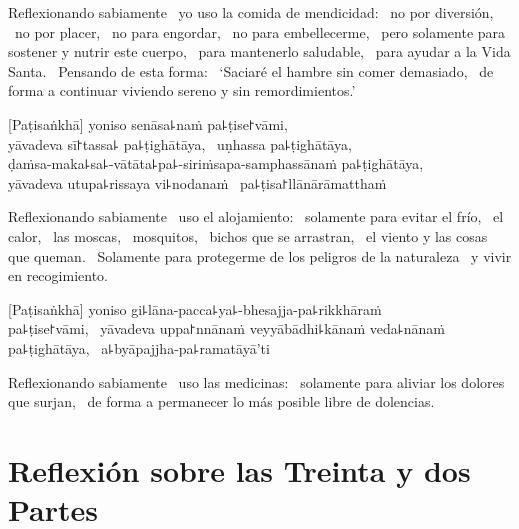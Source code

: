 \begin{english}
  Reflexionando sabiamente \pause\ yo uso la comida de mendicidad: \pause\ no por
  diversión, \pause\ no por placer, \pause\ no para engordar, \pause\ no para
  embellecerme, \pause\ pero solamente para sostener y nutrir este cuerpo, \pause\
  para mantenerlo saludable, \pause\ para ayudar a la Vida Santa. \pause\ Pensando
  de esta forma: \pause\ `Saciaré el hambre sin comer demasiado, \pause\ de
  forma a continuar viviendo sereno y sin remordimientos.'
\end{english}

\clearpage

[Paṭisaṅkhā] yoniso senāsa꜕naṁ pa꜕ṭise꜓vāmi, \pause\\
yāvadeva sī꜓tassa꜕ pa꜕ṭighātāya, \pause\ uṇhassa pa꜕ṭighātāya, \pause\\
ḍaṁsa-maka꜕sa꜕-vātāta꜕pa꜕-siriṁsapa-samphassānaṁ pa꜕ṭighātāya, \pause\\
yāvadeva utupa꜕rissaya vi꜕nodanaṁ \pause\ pa꜕ṭisa꜓llānārāmatthaṁ

\begin{english}
  Reflexionando sabiamente \pause\ uso el alojamiento: \pause\ solamente para evitar el
  frío, \pause\ el calor, \pause\ las moscas, \pause\ mosquitos, \pause\ bichos
  que se arrastran, \pause\ el viento y las cosas que queman. \pause\ Solamente para
  protegerme de los peligros de la naturaleza \pause\ y vivir en recogimiento.
\end{english}

[Paṭisaṅkhā] yoniso gi꜕lāna-pacca꜕ya꜕-bhesajja-pa꜕rikkhāraṁ\\
pa꜕ṭise꜓vāmi, \pause\ yāvadeva uppa꜓nnānaṁ veyyābādhi꜕kānaṁ veda꜕nānaṁ
pa꜕ṭighātāya, \pause\ a꜕byāpajjha-pa꜕ramatāyā'ti

\begin{english}
  Reflexionando sabiamente \pause\ uso las medicinas: \pause\ solamente para aliviar los dolores que surjan,
  \pause\ de forma a permanecer lo más posible libre de dolencias.
\end{english}

\chapter[Treinta y dos Partes]{Reflexión sobre las Treinta y dos Partes}


\begin{leader}
\end{leader}

